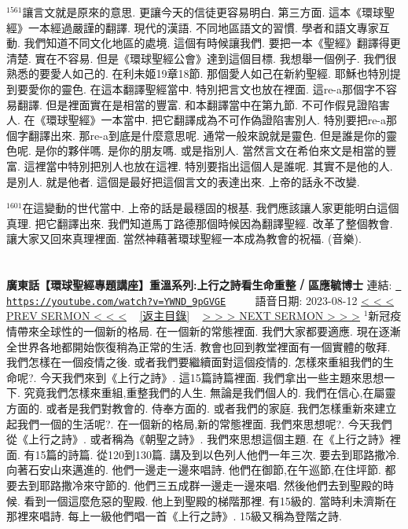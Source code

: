 \documentclass{book}
\begin{document}
$^{1561}$讓言文就是原來的意思.
更讓今天的信徒更容易明白.
第三方面.
這本《環球聖經》一本經過嚴謹的翻譯.
現代的漢語.
不同地區語文的習慣.
學者和語文專家互動.
我們知道不同文化地區的處境.
這個有時候讓我們.
要把一本《聖經》翻譯得更清楚.
實在不容易.
但是《環球聖經公會》達到這個目標.
我想舉一個例子.
我們很熟悉的要愛人如己的.
在利未姬19章18節.
那個愛人如己在新約聖經.
耶穌也特別提到要愛你的靈色.
在這本翻譯聖經當中.
特別把言文也放在裡面.
這re-a那個字不容易翻譯.
但是裡面實在是相當的豐富.
和本翻譯當中在第九節.
不可作假見證陷害人.
在《環球聖經》一本當中.
把它翻譯成為不可作偽證陷害別人.
特別要把re-a那個字翻譯出來.
那re-a到底是什麼意思呢.
通常一般來說就是靈色.
但是誰是你的靈色呢.
是你的夥伴嗎.
是你的朋友嗎.
或是指別人.
當然言文在希伯來文是相當的豐富.
這裡當中特別把別人也放在這裡.
特別要指出這個人是誰呢.
其實不是他的人.
是別人.
就是他者.
這個是最好把這個言文的表達出來.
上帝的話永不改變.

$^{1601}$在這變動的世代當中.
上帝的話是最穩固的根基.
我們應該讓人家更能明白這個真理.
把它翻譯出來.
我們知道馬丁路德那個時候因為翻譯聖經.
改革了整個教會.
讓大家又回來真理裡面.
當然神藉著環球聖經一本成為教會的祝福.
(音樂).
\newpage



\section{}
\label{sec:YWND_9pGVGE}
\textbf{廣東話【環球聖經專題講座】重溫系列:上行之詩看生命重整 ⧸ 區應毓博士}
\newline
\newline
連結: \href{https://youtube.com/watch?v=YWND_9pGVGE}{\texttt{ https://youtube.com/watch?v=YWND\_9pGVGE}} ~~~~ 語音日期: 2023-08-12 
\newline
\newline
\hyperref[sec:m3mUgMGT_bg]{\small{< < < PREV SERMON < < <}}
~
\hyperref[sec:index]{\small{[返主目錄]}}
~
\hyperref[sec:8a3cVfOxFFc]{\small{> > > NEXT SERMON > > >}}
\newline
\newline
$^{1}$新冠疫情帶來全球性的一個新的格局.
在一個新的常態裡面.
我們大家都要適應.
現在逐漸全世界各地都開始恢復稍為正常的生活.
教會也回到教堂裡面有一個實體的敬拜.
我們怎樣在一個疫情之後.
或者我們要繼續面對這個疫情的.
怎樣來重組我們的生命呢?.
今天我們來到《上行之詩》.
這15篇詩篇裡面.
我們拿出一些主題來思想一下.
究竟我們怎樣來重組,重整我們的人生.
無論是我們個人的.
我們在信心,在屬靈方面的.
或者是我們對教會的.
侍奉方面的.
或者我們的家庭.
我們怎樣重新來建立起我們一個的生活呢?.
在一個新的格局,新的常態裡面.
我們來思想呢?.
今天我們從《上行之詩》.
或者稱為《朝聖之詩》.
我們來思想這個主題.
在《上行之詩》裡面.
有15篇的詩篇.
從120到130篇.
講及到以色列人他們一年三次.
要去到耶路撒冷.
向著石安山來邁進的.
他們一邊走一邊來唱詩.
他們在御節,在午巡節,在住坪節.
都要去到耶路撒冷來守節的.
他們三五成群一邊走一邊來唱.
然後他們去到聖殿的時候.
看到一個這麼危惡的聖殿.
他上到聖殿的梯階那裡.
有15級的.
當時利未濟斯在那裡來唱詩.
每上一級他們唱一首《上行之詩》.
15級又稱為登階之詩.
\end{document}
